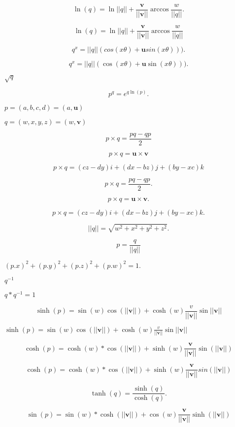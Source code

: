 \documentclass{article}
\begin{document}
\[\ln(q) = \ln||q|| + \frac{\boldsymbol{v}}{||\boldsymbol{v}||}\arccos\frac{w}{||q||}.\]
\pagebreak

\[\ln(q) = \ln||q|| + \frac{\boldsymbol{v}}{||\boldsymbol{v}||}\arccos\frac{w}{||q||}\]
\pagebreak

\[q^x = ||q||(cos(x\theta) + \boldsymbol{u}sin(x\theta))).\]
\pagebreak

\[q^x = ||q||(\cos(x\theta) + \boldsymbol{u}\sin(x\theta))).\]
\pagebreak

$\sqrt{q}$
\pagebreak

\[p^q = e^{q\ln(p)}.\]
\pagebreak

$p = (a, b, c, d) = (a, \boldsymbol{u})$
\pagebreak

$q = (w, x, y, z) = (w, \boldsymbol{v})$
\pagebreak

\[p \times q = \frac{pq- qp}{2}\]
\pagebreak

\[p \times q = \boldsymbol{u} \times \boldsymbol{v}\]
\pagebreak

\[p \times q = (cz-dy)i + (dx-bz)j + (by-xc)k \]
\pagebreak

\[p \times q = \frac{pq- qp}{2}.\]
\pagebreak

\[p \times q = \boldsymbol{u} \times \boldsymbol{v}.\]
\pagebreak

\[p \times q = (cz-dy)i + (dx-bz)j + (by-xc)k. \]
\pagebreak

\[||q|| = \sqrt{w^2 + x^2 + y^2 + z^2}.\]
\pagebreak

\[p = \frac{q}{||q||}\]
\pagebreak

$(p.x)^2 + (p.y)^2 + (p.z)^2 + (p.w)^2 = 1.$
\pagebreak

$q^{-1}$
\pagebreak

$q * q^{-1} = 1$
\pagebreak

\[\sinh(p) = \sin(w)\cos(||\boldsymbol{v}||) + \cosh(w)\frac{v}{||\boldsymbol{v}||}\sin||\boldsymbol{v}||\]
\pagebreak

$\sinh(p) = \sin(w)\cos(||\boldsymbol{v}||) + \cosh(w)\frac{v}{||\boldsymbol{v}||}\sin||\boldsymbol{v}||$
\pagebreak

\[\cosh(p) = \cosh(w) * \cos(||\boldsymbol{v}||) + \sinh(w)\frac{\boldsymbol{v}}{||\boldsymbol{v}||}\sin(||\boldsymbol{v}||)\]
\pagebreak

\[\cosh(p) = \cosh(w) * \cos(||\boldsymbol{v}||) + \sinh(w)\frac{\boldsymbol{v}}{||\boldsymbol{v}||}sin(||\boldsymbol{v}||)\]
\pagebreak

\[ \tanh(q) = \frac{\sinh(q)}{\cosh(q)}.\]
\pagebreak

\[\sin(p) = \sin(w) * \cosh(||\boldsymbol{v}||) + \cos(w)\frac{\boldsymbol{v}}{||\boldsymbol{v}||}\sinh(||\boldsymbol{v}||)\]
\pagebreak
\end{document}
